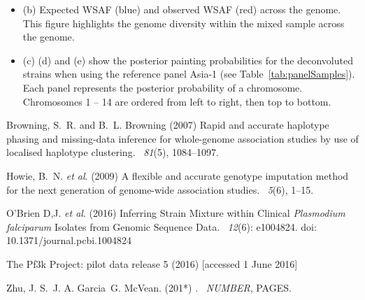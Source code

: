 \documentclass{article}
\begin{document}
\begin{itemize}
\item (b) Expected WSAF (blue) and observed WSAF (red) across the genome. This figure highlights the genome diversity within the mixed sample across the genome.

\item (c) (d) and (e) show the posterior painting probabilities for the deconvoluted strains when using the reference panel Asia-1 (see Table~\ref{tab:panelSamples}). Each panel represents the posterior probability of a chromosome. Chromosomes 1 -- 14 are ordered from left to right, then top to bottom.
\end{itemize}



\begin{thebibliography}{}

Browning, S.~R. and B.~L. Browning (2007)
\newblock Rapid and accurate haplotype phasing and missing-data inference for
  whole-genome association studies by use of localised haplotype clustering.
~{\em 81\/}(5), 1084--1097.

Howie, B.~N. {\em et al}. (2009)
\newblock A flexible and accurate genotype imputation method for the next
  generation of genome-wide association studies.
~{\em 5\/}(6), 1--15.



O'Brien D,J. {\em et al}. (2016)
\newblock Inferring Strain Mixture within Clinical {\em Plasmodium falciparum} Isolates from Genomic Sequence Data. ~{\em 12\/}(6): e1004824. doi: 10.1371/journal.pcbi.1004824


The Pf3k Project: pilot data release 5 (2016)
 [accessed 1 June 2016]


Zhu, J. S.\, J. A. Garcia\, G. McVean. (201*)
.
~{\em NUMBER\/}, PAGES.

\end{thebibliography}
\end{document}
